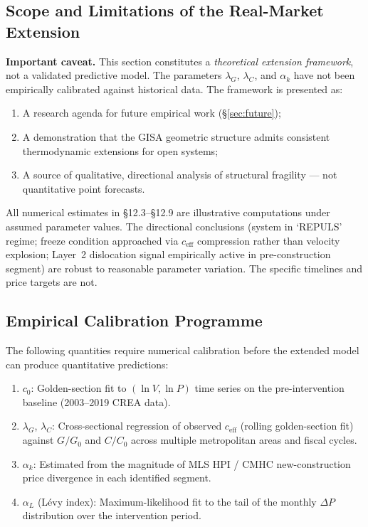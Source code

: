 \documentclass[12pt,a4paper]{article}
\begin{document}
\subsection{Scope and Limitations of the Real-Market Extension}

\textbf{Important caveat.}\quad
This section constitutes a \emph{theoretical extension framework},
not a validated predictive model. The parameters
$\lambda_G$, $\lambda_C$, and $\alpha_k$ have not been empirically
calibrated against historical data. The framework is presented as:
\begin{enumerate}
    \item A research agenda for future empirical work (\S\ref{sec:future});
    \item A demonstration that the GISA geometric structure admits
          consistent thermodynamic extensions for open systems;
    \item A source of qualitative, directional analysis of structural
          fragility --- not quantitative point forecasts.
\end{enumerate}
All numerical estimates in \S12.3--\S12.9 are illustrative computations
under assumed parameter values. The directional conclusions (system in
`REPULS' regime; freeze condition approached via $c_{\mathrm{eff}}$
compression rather than velocity explosion; Layer~2 dislocation signal
empirically active in pre-construction segment) are robust to reasonable
parameter variation. The specific timelines and price targets are not.

\subsection{Empirical Calibration Programme}

The following quantities require numerical calibration before the
extended model can produce quantitative predictions:

\begin{enumerate}
    \item $c_0$: Golden-section fit to $(\ln V, \ln P)$ time series
          on the pre-intervention baseline (2003--2019 CREA data).
    \item $\lambda_G$, $\lambda_C$: Cross-sectional regression of
          observed $c_{\mathrm{eff}}$ (rolling golden-section fit)
          against $G/G_0$ and $C/C_0$ across multiple metropolitan
          areas and fiscal cycles.
    \item $\alpha_k$: Estimated from the magnitude of MLS HPI /
          CMHC new-construction price divergence in each identified
          segment.
    \item $\alpha_L$ (L\'evy index): Maximum-likelihood fit to the
          tail of the monthly $\Delta P$ distribution over the
          intervention period.
\end{enumerate}
\end{document}
